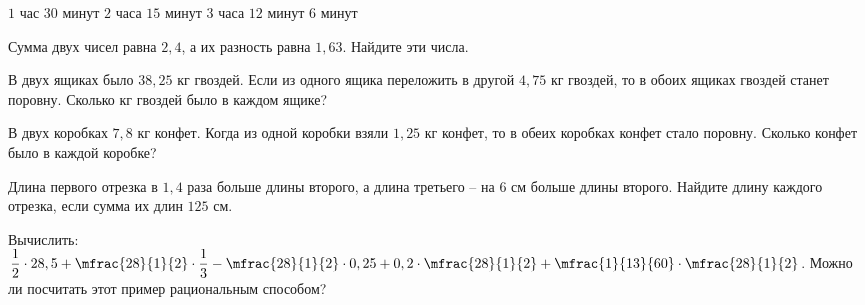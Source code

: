 \begin{class}[number=5]
\begin{listofex}
\begin{tasks}
			\task \(1\) час \(30\) минут
			\task \(2\) часа \(15\) минут
			\task \(3\) часа \(12\) минут
			\task \(6\) минут
		\end{tasks}
		\item Сумма двух чисел равна \(2,4\), а их разность равна \(1,63\). Найдите эти числа.
		\item В двух ящиках было \(38,25\) кг гвоздей. Если из одного ящика переложить в другой \(4,75\) кг гвоздей, то в обоих ящиках гвоздей станет поровну. Сколько кг гвоздей было в каждом ящике?
		\item В двух коробках \(7,8\) кг конфет. Когда из одной коробки взяли \(1,25\) кг конфет, то в обеих коробках конфет стало поровну. Сколько конфет было в каждой коробке?
		
		\item Длина первого отрезка в \(1,4\) раза больше длины второго, а длина третьего – на \(6\) см больше длины второго. Найдите длину каждого отрезка, если сумма их длин \(125\) см.
		\item Вычислить: \(\dfrac{1}{2} \cdot 28,5 + \mfrac{28}{1}{2} \cdot \dfrac{1}{3} - \mfrac{28}{1}{2} \cdot 0,25 + 0,2 \cdot \mfrac{28}{1}{2} + \mfrac{1}{13}{60} \cdot \mfrac{28}{1}{2}\). Можно ли посчитать этот пример рациональным способом?
	\end{listofex}
\end{class}
%
%
%
%	
%
%
